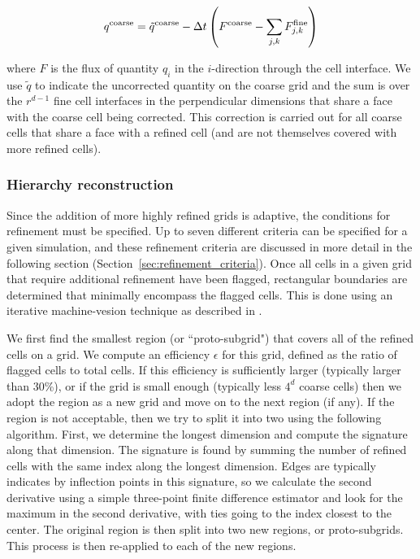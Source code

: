 \begin{equation}
  q^{\rm coarse} = \tilde{q}^{\rm coarse} - \Delta t \left( F^{\rm
      coarse} - \sum_{j,k} F^{\rm fine}_{j,k} \right)
\end{equation}

where $F$ is the flux of quantity $q_i$ in the $i$-direction through the cell interface.   We use $\tilde{q}$ to indicate the uncorrected quantity on the coarse grid and the sum is over the $r^{d-1}$ fine cell interfaces in the perpendicular dimensions that share a face with the coarse cell being corrected.  This correction is carried out for all coarse cells that share a face with a refined cell (and are not themselves covered with more refined cells).

\subsubsection{Hierarchy reconstruction}
\label{sec:hierarchy_reconstruction}

Since the addition of more highly refined grids is adaptive, the conditions for refinement must be specified.  Up to seven different criteria can be specified for a given simulation, and these refinement criteria are discussed in more detail in the following section (Section~\ref{sec:refinement_criteria}).   Once all cells in a given grid that require additional refinement have been flagged, rectangular boundaries are determined that minimally encompass the flagged cells.  This is done using an iterative machine-vesion technique as described in .  

We first find the smallest region (or ``proto-subgrid") that covers all of the refined cells on a grid.  We compute an efficiency $\epsilon$ for this grid, defined as the ratio of flagged cells to total cells.  If this efficiency is sufficiently larger (typically larger than 30\%), or if the grid is small enough (typically less $4^d$ coarse cells) then we adopt the region as a new grid and move on to the next region (if any).  If the region is not acceptable, then we try to split it into two using the following algorithm.  First, we determine the longest dimension and compute the signature along that dimension.  The signature is found by summing the number of refined cells with the same index along the longest dimension.  Edges are typically indicates by inflection points in this signature, so we calculate the second derivative using a simple three-point finite difference estimator and look for the maximum in the second derivative, with ties going to the index closest to the center.  The original region is then split into two new regions, or proto-subgrids.  This process is then re-applied to each of the new regions.

